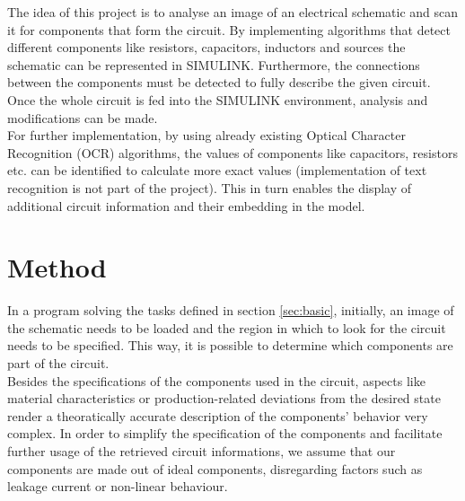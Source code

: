 \documentclass[10pt,twocolumn,letterpaper]{article}
\begin{document}
The idea of this project is to analyse an image of an electrical schematic and scan it for components that form the circuit. By implementing algorithms that detect different components like resistors, capacitors, inductors and sources the schematic can be represented in SIMULINK. Furthermore, the connections between the components must be detected to fully describe the given circuit. Once the whole circuit is fed into the SIMULINK environment, analysis and modifications can be made.\\

For further implementation, by using already existing Optical Character Recognition (OCR) algorithms, the values of components like capacitors, resistors etc. can be identified to calculate more exact values (implementation of text recognition is not part of the project). This in turn enables the display of additional circuit information and their embedding in the model.


\section{Method}

In a program solving the tasks defined in section \ref{sec:basic}, initially, an image of the schematic needs to be loaded and the region in which to look for the circuit needs to be specified. This way, it is possible to determine which components are part of the circuit.\\


Besides the specifications of the components used in the circuit, aspects like material characteristics or production-related deviations from the desired state render a theoratically accurate description of the components' behavior very complex. In order to simplify the specification of the components and facilitate further usage of the retrieved circuit informations, we assume that our components are made out of ideal components, disregarding factors such as leakage current or non-linear behaviour.\\
\end{document}
